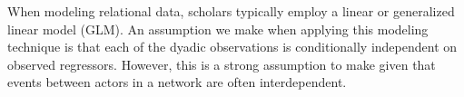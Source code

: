 \documentclass[12pt,pdflatex]{elsarticle}
\begin{document}

When modeling relational data, scholars typically employ a linear or generalized linear model (GLM). An assumption we make when applying this modeling technique is that each of the dyadic observations is conditionally independent on observed regressors. However, this is a strong assumption to make given that events between actors in a network are often interdependent. 
\end{document}
